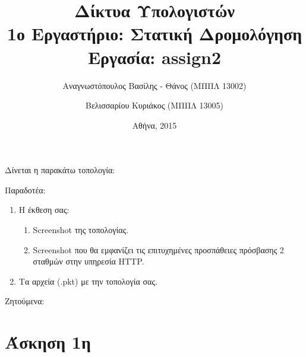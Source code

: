 \documentclass{assignment}
\title{Δίκτυα Υπολογιστών \\ 1ο Εργαστήριο: Στατική Δρομολόγηση \\ Εργασία: assign2}
\date{Αθήνα, 2015}
\author{Αναγνωστόπουλος Βασίλης - Θάνος (ΜΠΠΛ 13002) \and Βελισσαρίου Κυριάκος (ΜΠΠΛ 13005)}
\begin{document}
\maketitle

\setcounter{page}{1} 

\pagestyle{plain}
\tableofcontents
\listoftables
\listoffigures
\newpage

\setcounter{page}{1} 


Δίνεται η παρακάτω τοπολογία:

\begin{center}
\end{center}
 
Παραδοτέα:

\begin{enumerate}
  \item Η έκθεση σας:
  \begin{enumerate}
     \item Screenshot της τοπολογίας.
     \item Screenshot που θα εμφανίζει τις επιτυχημένες προσπάθειες πρόσβασης 2 σταθμών στην υπηρεσία HTTP.
  \end{enumerate}
  \item Τα αρχεία (.pkt) με την τοπολογία σας.
\end{enumerate}

Ζητούμενα:


\section{Άσκηση 1η}
\end{document}
